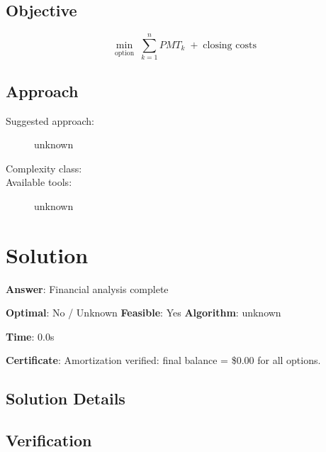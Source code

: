 \documentclass[11pt, a4paper]{article}
\begin{document}
\subsection{Objective}

\begin{equation}
\min_{\text{option}} \; \sum_{k=1}^{n} PMT_k \; + \; \text{closing costs}
\end{equation}

\subsection{Approach}

\begin{description}
  \item[Suggested approach:] unknown
  \item[Complexity class:] 
  \item[Available tools:] unknown
\end{description}
\section{Solution}

\begin{polyaresult}

\textbf{Answer}: Financial analysis complete


\textbf{Optimal}: No / Unknown \hfill
\textbf{Feasible}: Yes
\textbf{Algorithm}: unknown \quad $$

\textbf{Time}: 0.0s

\textbf{Certificate}: Amortization verified: final balance = \$0.00 for all options.

\end{polyaresult}

\subsection{Solution Details}



\subsection{Verification}
\end{document}
